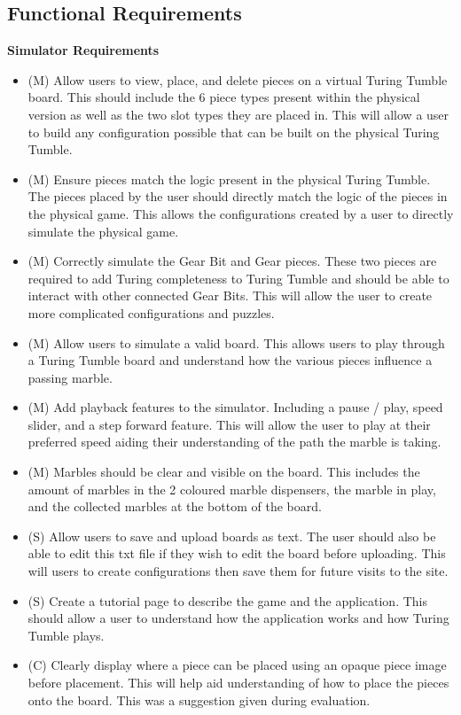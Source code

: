\documentclass{l4proj}
\begin{document}
\subsection{Functional Requirements}
\textbf{Simulator Requirements}
\begin{itemize}
    \item (M) Allow users to view, place, and delete pieces on a virtual Turing Tumble board. This should include the 6 piece types present within the physical version as well as the two slot types they are placed in. This will allow a user to build any configuration possible that can be built on the physical Turing Tumble.
    \item (M) Ensure pieces match the logic present in the physical Turing Tumble. The pieces placed by the user should directly match the logic of the pieces in the physical game. This allows the configurations created by a user to directly simulate the physical game.
    \item (M) Correctly simulate the Gear Bit and Gear pieces. These two pieces are required to add Turing completeness to Turing Tumble and should be able to interact with other connected Gear Bits. This will allow the user to create more complicated configurations and puzzles.
    \item (M) Allow users to simulate a valid board. This allows users to play through a Turing Tumble board and understand how the various pieces influence a passing marble.
    \item (M) Add playback features to the simulator. Including a pause / play, speed slider, and a step forward feature. This will allow the user to play at their preferred speed aiding their understanding of the path the marble is taking.
    \item (M) Marbles should be clear and visible on the board. This includes the amount of marbles in the 2 coloured marble dispensers, the marble in play, and the collected marbles at the bottom of the board.
    \item (S) Allow users to save and upload boards as text. The user should also be able to edit this txt file if they wish to edit the board before uploading. This will users to create configurations then save them for future visits to the site.
    \item (S) Create a tutorial page to describe the game and the application. This should allow a user to understand how the application works and how Turing Tumble plays.
    \item (C) Clearly display where a piece can be placed using an opaque piece image before placement. This will help aid understanding of how to place the pieces onto the board. This was a suggestion given during evaluation.

\end{itemize}
\end{document}
